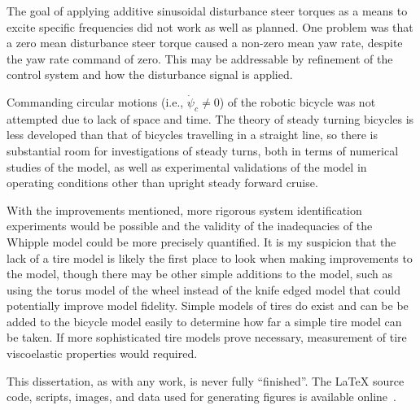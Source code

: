The goal of applying additive sinusoidal disturbance steer torques as a means
to excite specific frequencies did not work as well as planned. One problem was
that a zero mean disturbance steer torque caused a non-zero mean yaw rate,
despite the yaw rate command of zero. This may be addressable by refinement of
the control system and how the disturbance signal is applied.

Commanding circular motions (i.e., $\dot{\psi}_c \ne 0$) of the robotic bicycle
was not attempted due to lack of space and time. The theory of steady turning
bicycles is less developed than that of bicycles travelling in a straight line,
so there is substantial room for investigations of steady turns, both in terms
of numerical studies of the model, as well as experimental validations of the
model in operating conditions other than upright steady forward cruise.

With the improvements mentioned, more rigorous system identification
experiments would be possible and the validity of the inadequacies of the
Whipple model could be more precisely quantified. It is my suspicion that the
lack of a tire model is likely the first place to look when making improvements
to the model, though there may be other simple additions to the model, such as
using the torus model of the wheel instead of the knife edged model that could
potentially improve model fidelity. Simple models of tires do exist and can be
be added to the bicycle model easily to determine how far a simple tire model
can be taken. If more sophisticated tire models prove necessary, measurement of
tire viscoelastic properties would required.

This dissertation, as with any work, is never fully ``finished''. The \LaTeX{}
source code, scripts, images, and data used for generating figures is available
online~\cite{Peterson2013}.

